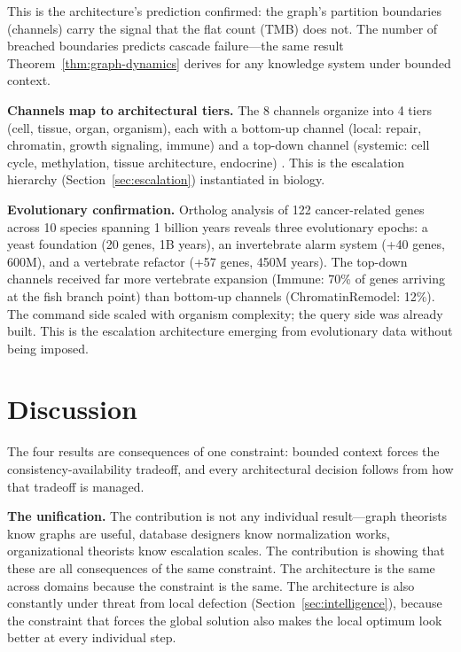 \documentclass[11pt]{article}
\theoremstyle{definition}
\theoremstyle{remark}
\begin{document}
This is the architecture's prediction confirmed: the graph's partition
boundaries (channels) carry the signal that the flat count (TMB) does
not. The number of breached boundaries predicts cascade failure---the
same result Theorem~\ref{thm:graph-dynamics} derives for any
knowledge system under bounded context.

\textbf{Channels map to architectural tiers.}
The 8 channels organize into 4 tiers (cell, tissue, organ, organism),
each with a bottom-up channel (local: repair, chromatin, growth
signaling, immune) and a top-down channel (systemic: cell cycle,
methylation, tissue architecture, endocrine) \cite{McCarthy2026f}.
This is the escalation hierarchy (Section~\ref{sec:escalation})
instantiated in biology.

\textbf{Evolutionary confirmation.}
Ortholog analysis of 122 cancer-related genes across 10 species
spanning 1 billion years reveals three evolutionary epochs: a yeast
foundation (20 genes, 1B years), an invertebrate alarm system
(+40 genes, 600M), and a vertebrate refactor (+57 genes, 450M years).
The top-down channels received far more vertebrate expansion
(Immune: 70\% of genes arriving at the fish branch point) than
bottom-up channels (ChromatinRemodel: 12\%). The command side
scaled with organism complexity; the query side was already built.
This is the escalation architecture emerging from evolutionary data
without being imposed.

\section{Discussion}
\label{sec:discussion}

The four results are consequences of one constraint: bounded context
forces the consistency-availability tradeoff, and every architectural
decision follows from how that tradeoff is managed.

\textbf{The unification.}
The contribution is not any individual result---graph theorists know
graphs are useful, database designers know normalization works,
organizational theorists know escalation scales. The contribution
is showing that these are all consequences of the same constraint.
The architecture is the same across domains because the constraint
is the same. The architecture is also constantly under threat from
local defection (Section~\ref{sec:intelligence}), because the
constraint that forces the global solution also makes the local
optimum look better at every individual step.
\end{document}
